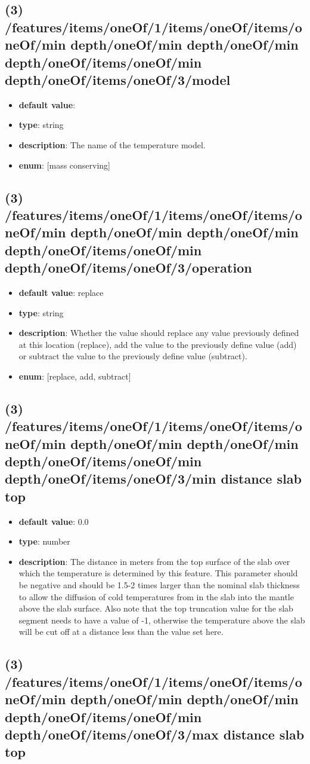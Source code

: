 \subsection{(3) /features/items/oneOf/1/items/oneOf/items/oneOf/min depth/oneOf/min depth/oneOf/min depth/oneOf/items/oneOf/min depth/oneOf/items/oneOf/3/model}
\begin{itemize}[leftmargin=3em]\item {\bf default value}: 
\item {\bf type}: string
\item {\bf description}: The name of the temperature model.
\item {\bf enum}: [mass conserving]\end{itemize}\subsection{(3) /features/items/oneOf/1/items/oneOf/items/oneOf/min depth/oneOf/min depth/oneOf/min depth/oneOf/items/oneOf/min depth/oneOf/items/oneOf/3/operation}
\begin{itemize}[leftmargin=3em]\item {\bf default value}: replace
\item {\bf type}: string
\item {\bf description}: Whether the value should replace any value previously defined at this location (replace), add the value to the previously define value (add) or subtract the value to the previously define value (subtract).
\item {\bf enum}: [replace, add, subtract]\end{itemize}\subsection{(3) /features/items/oneOf/1/items/oneOf/items/oneOf/min depth/oneOf/min depth/oneOf/min depth/oneOf/items/oneOf/min depth/oneOf/items/oneOf/3/min distance slab top}
\begin{itemize}[leftmargin=3em]\item {\bf default value}: 0.0
\item {\bf type}: number
\item {\bf description}: The distance in meters from the top surface of the slab over which the temperature is determined by this feature. This parameter should be negative and should be 1.5-2 times larger than the nominal slab thickness to allow the diffusion of cold temperatures from in the slab into the mantle above the slab surface. Also note that the top truncation value for the slab segment needs to have a value of -1, otherwise the temperature above the slab will be cut off at a distance less than the value set here.
\end{itemize}\subsection{(3) /features/items/oneOf/1/items/oneOf/items/oneOf/min depth/oneOf/min depth/oneOf/min depth/oneOf/items/oneOf/min depth/oneOf/items/oneOf/3/max distance slab top}
